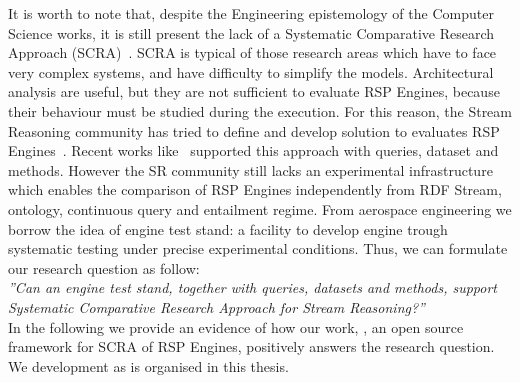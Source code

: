 It is worth to note that, despite the Engineering epistemology of the Computer Science works, it is still present the lack of a Systematic Comparative Research Approach (SCRA)~\cite{Tichy:1995:EEC:209090.209093}. SCRA is typical of those research areas which have to face very complex systems, and have difficulty to simplify the models. Architectural analysis are useful, but they are not sufficient to evaluate RSP Engines, because their behaviour must be studied during the execution. For this reason, the Stream Reasoning community has tried to define and develop solution to evaluates RSP Engines~\cite{DBLP:conf/esws/ScharrenbachUMVB13}. Recent works like~\cite{Zhang2012, LePhuoc2012c, DBLP:conf/semweb/DellAglioCBCV13} supported this approach with queries, dataset and methods. However the SR community still lacks an experimental infrastructure which enables the comparison of RSP Engines independently from RDF Stream, ontology, continuous query and entailment regime.  From aerospace engineering we borrow the idea of engine test stand: a facility to develop engine trough systematic testing under precise experimental conditions. Thus, we can formulate our research question as follow:\\

\textit{”Can an engine test stand, together with queries, datasets and methods, support Systematic Comparative Research Approach for Stream Reasoning?”}\\


\noindent In the following we provide an evidence of how our work, \name, an open source framework for SCRA of RSP Engines, positively answers the research question. We development as is organised in this thesis.

